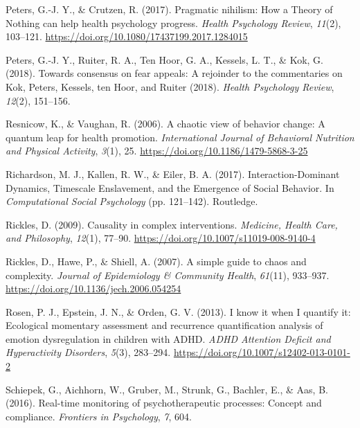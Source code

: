 \documentclass[
  british,
  man,floatsintext]{apa6}
\begin{document}
\leavevmode\hypertarget{ref-petersPragmaticNihilismHow2017}{}%
Peters, G.-J. Y., \& Crutzen, R. (2017). Pragmatic nihilism: How a Theory of Nothing can help health psychology progress. \emph{Health Psychology Review}, \emph{11}(2), 103--121. \url{https://doi.org/10.1080/17437199.2017.1284015}

\leavevmode\hypertarget{ref-petersConsensusFearAppeals2018}{}%
Peters, G.-J. Y., Ruiter, R. A., Ten Hoor, G. A., Kessels, L. T., \& Kok, G. (2018). Towards consensus on fear appeals: A rejoinder to the commentaries on Kok, Peters, Kessels, ten Hoor, and Ruiter (2018). \emph{Health Psychology Review}, \emph{12}(2), 151--156.

\leavevmode\hypertarget{ref-resnicowChaoticViewBehavior2006}{}%
Resnicow, K., \& Vaughan, R. (2006). A chaotic view of behavior change: A quantum leap for health promotion. \emph{International Journal of Behavioral Nutrition and Physical Activity}, \emph{3}(1), 25. \url{https://doi.org/10.1186/1479-5868-3-25}

\leavevmode\hypertarget{ref-richardsonInteractionDominantDynamicsTimescale2017}{}%
Richardson, M. J., Kallen, R. W., \& Eiler, B. A. (2017). Interaction-Dominant Dynamics, Timescale Enslavement, and the Emergence of Social Behavior. In \emph{Computational Social Psychology} (pp. 121--142). Routledge.

\leavevmode\hypertarget{ref-ricklesCausalityComplexInterventions2009}{}%
Rickles, D. (2009). Causality in complex interventions. \emph{Medicine, Health Care, and Philosophy}, \emph{12}(1), 77--90. \url{https://doi.org/10.1007/s11019-008-9140-4}

\leavevmode\hypertarget{ref-ricklesSimpleGuideChaos2007}{}%
Rickles, D., Hawe, P., \& Shiell, A. (2007). A simple guide to chaos and complexity. \emph{Journal of Epidemiology \& Community Health}, \emph{61}(11), 933--937. \url{https://doi.org/10.1136/jech.2006.054254}

\leavevmode\hypertarget{ref-rosenKnowItWhen2013}{}%
Rosen, P. J., Epstein, J. N., \& Orden, G. V. (2013). I know it when I quantify it: Ecological momentary assessment and recurrence quantification analysis of emotion dysregulation in children with ADHD. \emph{ADHD Attention Deficit and Hyperactivity Disorders}, \emph{5}(3), 283--294. \url{https://doi.org/10.1007/s12402-013-0101-2}

\leavevmode\hypertarget{ref-schiepekRealtimeMonitoringPsychotherapeutic2016}{}%
Schiepek, G., Aichhorn, W., Gruber, M., Strunk, G., Bachler, E., \& Aas, B. (2016). Real-time monitoring of psychotherapeutic processes: Concept and compliance. \emph{Frontiers in Psychology}, \emph{7}, 604.
\end{document}
